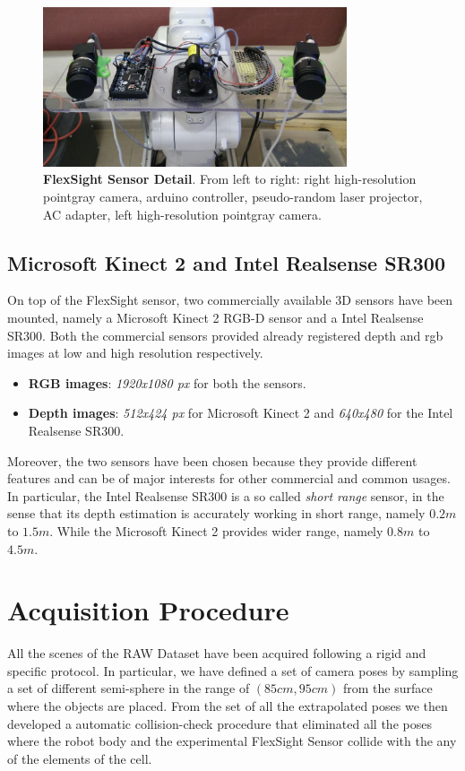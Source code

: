 \begin{figure}
    \centering
    \includegraphics[width=0.8\textwidth]{figures/3_raw_dataset/fs_sensor_0}
    \caption{\textbf{FlexSight Sensor Detail}. From left to right: right high-resolution pointgray camera, arduino controller, pseudo-random laser projector, AC adapter, left high-resolution pointgray camera.}
    \label{fig:fs_sensor_0}
\end{figure}

\subsection{Microsoft Kinect 2 and Intel Realsense SR300}\label{subsec:raw_setup_kin&realsense}
On top of the FlexSight sensor, two commercially available 3D sensors have been mounted, namely a Microsoft Kinect 2 RGB-D sensor and a Intel Realsense SR300. Both the commercial sensors provided already registered depth and rgb images at low and high resolution respectively.

\begin{itemize}
	\item \textbf{RGB images}: \emph{1920x1080 px} for both the sensors.
	\item \textbf{Depth images}: \emph{512x424 px} for Microsoft Kinect 2 and \emph{640x480} for the Intel Realsense SR300.
\end{itemize}

Moreover, the two sensors have been chosen because they provide different features and can be of major interests for other commercial and common usages. In particular, the Intel Realsense SR300 is a so called \emph{short range} sensor, in the sense that its depth estimation is accurately working in short range, namely $0.2m$ to $1.5m$. While the Microsoft Kinect 2 provides wider range, namely $0.8m$ to $4.5m$.

\section{Acquisition Procedure}\label{sec:raw_acquisition_procedure}
All the scenes of the RAW Dataset have been acquired following a rigid and specific protocol. In particular, we have defined a set of camera poses by sampling a set of different semi-sphere in the range of $(85cm, 95cm)$ from the surface where the objects are placed. From the set of all the extrapolated poses we then developed a automatic collision-check procedure that eliminated all the poses where the robot body and the experimental FlexSight Sensor collide with the any of the elements of the cell.

